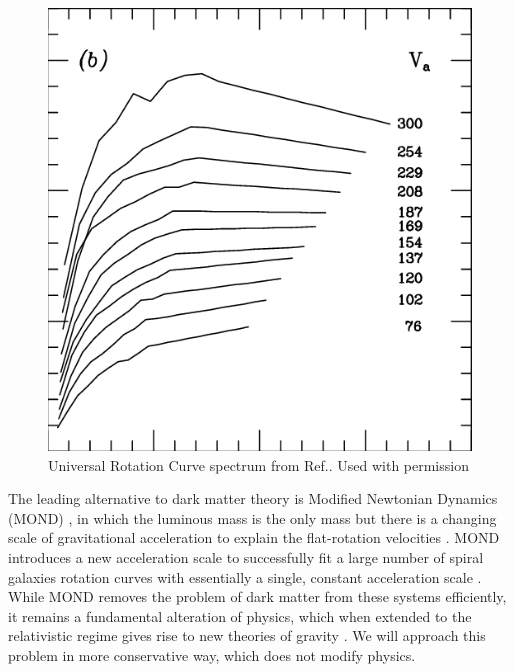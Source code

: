 \documentclass[reprint,%
 amsmath,amssymb,
 aps,
]{revtex4-1}
\begin{document}
 \begin{figure}[h!]
     \centering
     \includegraphics[width=\linewidth]{The-universal-rotation-curve-of-spiral-galaxies-at-different-luminosities-and-velocities}
     \caption{Universal Rotation Curve spectrum from Ref.\citep{salucci}. Used with permission}
     \label{fig:URC}
\end{figure}
 
 
 
The   leading   alternative     to dark matter theory is   Modified Newtonian Dynamics (MOND) \cite{Milgrom},  in which     the   luminous mass is the only mass   but  there is   a changing   scale of gravitational acceleration to explain the flat-rotation velocities  \cite{McGaugh_2014}. 
MOND introduces a new acceleration scale to successfully fit   a large number of spiral galaxies  rotation curves with essentially a single, constant acceleration scale \cite{2016Lelli}. 
While MOND removes the problem of dark matter from these systems efficiently, it   remains a   fundamental  alteration of   physics, which when extended  to the relativistic regime   gives rise to  new theories of gravity  \cite{PhysRevD.70.083509,doi:10.1142/S0217751X0703666X,Famaey2012}.
We  will   approach this problem in  more conservative way,  which does not  modify physics.
\end{document}

